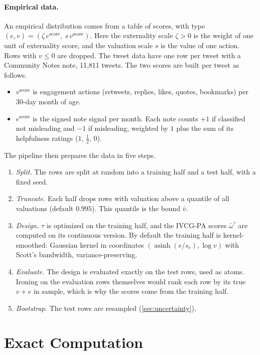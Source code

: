 \documentclass[11pt]{article}
\begin{document}
\paragraph{Empirical data.} An empirical distribution comes from a table of scores, with type $(e,v)=(\zeta\,e^{\mathrm{score}},\ s\,v^{\mathrm{score}})$. Here the externality scale $\zeta>0$ is the weight of one unit of externality score, and the valuation scale $s$ is the value of one action. Rows with $v\leq0$ are dropped. The tweet data have one row per tweet with a Community Notes note, 11{,}811 tweets. The two scores are built per tweet as follows.
\begin{itemize}
    \item $v^{\mathrm{score}}$ is engagement actions (retweets, replies, likes, quotes, bookmarks) per 30-day month of age.
    \item $e^{\mathrm{score}}$ is the signed note signal per month. Each note counts $+1$ if classified not misleading and $-1$ if misleading, weighted by $1$ plus the sum of its helpfulness ratings ($1$, $\tfrac12$, $0$).
\end{itemize}
The pipeline then prepares the data in five steps.
\begin{enumerate}
    \item \emph{Split.} The rows are split at random into a training half and a test half, with a fixed seed.
    \item \emph{Truncate.} Each half drops rows with valuation above a quantile of all valuations (default $0.995$). This quantile is the bound $\bar v$.
    \item \emph{Design.} $\tau$ is optimized on the training half, and the IVCG-PA scores $\bar\omega^\tau$ are computed on its continuous version. By default the training half is kernel-smoothed: Gaussian kernel in coordinates $(\operatorname{asinh}(e/s_e),\log v)$ with Scott's bandwidth, variance-preserving.
    \item \emph{Evaluate.} The design is evaluated exactly on the test rows, used as atoms. Ironing on the evaluation rows themselves would rank each row by its true $v+e$ in sample, which is why the scores come from the training half.
    \item \emph{Bootstrap.} The test rows are resampled (\cref{sec:uncertainty}).
\end{enumerate}

\section{Exact Computation}\label{sec:exact}
\end{document}
